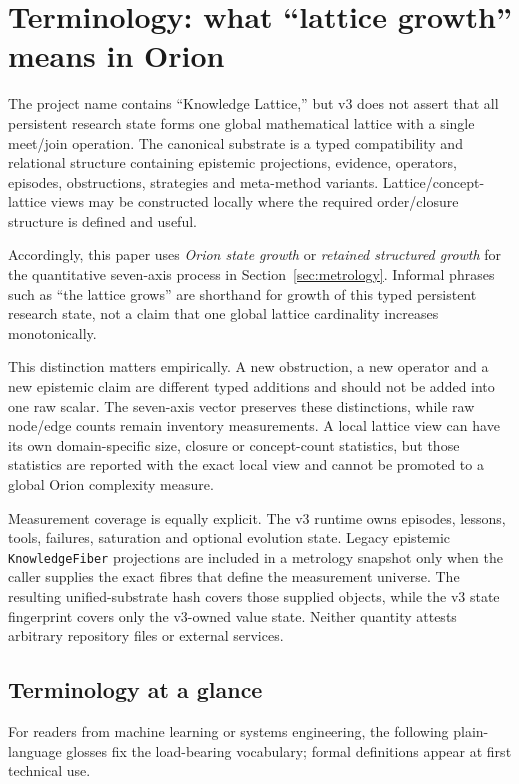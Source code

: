 \section{Terminology: what ``lattice growth'' means in Orion}
\label{sec:terminology}

The project name \RAKL{} contains ``Knowledge Lattice,'' but v3 does not assert that all persistent research state forms one global mathematical lattice with a single meet/join operation. The canonical substrate is a typed compatibility and relational structure containing epistemic projections, evidence, operators, episodes, obstructions, strategies and meta-method variants. Lattice/concept-lattice views may be constructed locally where the required order/closure structure is defined and useful.

Accordingly, this paper uses \emph{Orion state growth} or \emph{retained structured growth} for the quantitative seven-axis process in Section~\ref{sec:metrology}. Informal phrases such as ``the lattice grows'' are shorthand for growth of this typed persistent research state, not a claim that one global lattice cardinality increases monotonically.

This distinction matters empirically. A new obstruction, a new operator and a new epistemic claim are different typed additions and should not be added into one raw scalar. The seven-axis vector preserves these distinctions, while raw node/edge counts remain inventory measurements. A local lattice view can have its own domain-specific size, closure or concept-count statistics, but those statistics are reported with the exact local view and cannot be promoted to a global Orion complexity measure.

Measurement coverage is equally explicit. The v3 runtime owns episodes, lessons, tools, failures, saturation and optional evolution state. Legacy epistemic \texttt{KnowledgeFiber} projections are included in a metrology snapshot only when the caller supplies the exact fibres that define the measurement universe. The resulting unified-substrate hash covers those supplied objects, while the v3 state fingerprint covers only the v3-owned value state. Neither quantity attests arbitrary repository files or external services.

\subsection{Terminology at a glance}

For readers from machine learning or systems engineering, the following plain-language glosses fix the load-bearing vocabulary; formal definitions appear at first technical use.

